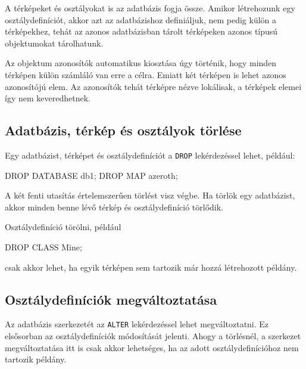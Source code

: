 A térképeket és osztályokat is az adatbázis fogja össze. Amikor létrehozunk egy osztálydefiníciót, akkor azt az adatbázishoz definiáljuk, nem pedig külön a térképekhez, tehát az azonos adatbázisban tárolt térképeken azonos típusú objektumokat tárolhatunk.

Az objektum azonosítók automatikus kiosztása úgy történik, hogy minden térképen külön számláló van erre a célra. Emiatt két térképen is lehet azonos azonosítójú elem. Az azonosítók tehát térképre nézve lokálisak, a térképek elemei így nem keveredhetnek.

\subsection{Adatbázis, térkép és osztályok törlése}

Egy adatbázist, térképet és osztálydefiníciót a \texttt{DROP} lekérdezéssel lehet, például:
\begin{sql}
DROP DATABASE db1;
DROP MAP azeroth;
\end{sql}
A két fenti utasítás értelemszerűen törlést visz végbe. Ha törlök egy adatbázist, akkor minden benne lévő térkép és osztálydefiníció törlődik.

Osztálydefiníció törölni, például
\begin{sql}
DROP CLASS Mine;
\end{sql}
csak akkor lehet, ha egyik térképen sem tartozik már hozzá létrehozott példány.

\subsection{Osztálydefiníciók megváltoztatása}

Az adatbázis szerkezetét az \texttt{ALTER} lekérdezéssel lehet megváltoztatni. Ez elsősorban az osztálydefiníciók módosítását jelenti. Ahogy a törlésnél, a szerkezet megváltoztatása itt is csak akkor lehetséges, ha az adott osztálydefinícióhoz nem tartozik példány.

